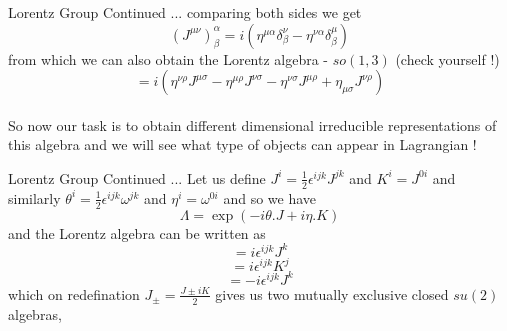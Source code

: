 \documentclass{beamer}
\begin{document}
\begin{frame}{Lorentz Group Continued ...}
    comparing both sides we get
\begin{equation}
    (J^{\mu\nu})^{\alpha}_{\beta} = i(\eta^{\mu\alpha}\delta^{\nu}_{\beta} - \eta^{\nu\alpha}\delta^{\mu}_{\beta})
\end{equation} from which we can also obtain the Lorentz algebra - $so(1, 3)$ (check yourself !)
\begin{equation}
    [J^{\mu\nu}, J^{\rho\sigma}] = i(\eta^{\nu\rho}J^{\mu\sigma} - \eta^{\mu\rho}J^{\nu\sigma} - \eta^{\nu\sigma}J^{\mu\rho} + \eta_{\mu\sigma}J^{\nu\rho})
\end{equation} \\
\vspace{5mm}
So now our task is to obtain different dimensional irreducible representations of this algebra and we will see what type of objects can appear in Lagrangian ! 
\end{frame}
\begin{frame}{Lorentz Group Continued ...}
Let us define $J^{i} = \frac{1}{2}\epsilon^{ijk}J^{jk}$ and $K^{i} = J^{0i}$ and similarly $\theta^{i} = \frac{1}{2}\epsilon^{ijk}\omega^{jk}$ and $\eta^{i} = \omega^{0i}$ and so we have
\begin{equation}
    \Lambda = \exp(-i\theta.J + i\eta.K)
\end{equation} and the Lorentz algebra can be written as
\begin{equation}
    [J^{i}, J^{j}] = i\epsilon^{ijk}J^{k}
\end{equation}
\begin{equation}
    [J^{i}, K^{j}] = i\epsilon^{ijk}K^{j}
\end{equation}
\begin{equation}
    [K^{i}, K^{j}] = -i\epsilon^{ijk}J^{k}
\end{equation} which on redefination $J_{\pm} = \frac{J \pm iK}{2}$ gives us two mutually exclusive closed $su(2)$ algebras, 
\end{frame}
\end{document}
